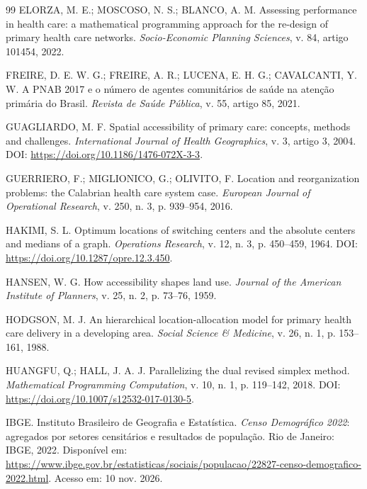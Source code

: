 \documentclass[12pt,a4paper,oneside]{report}
\begin{document}
\begin{thebibliography}{99}
ELORZA, M. E.; MOSCOSO, N. S.; BLANCO, A. M. Assessing performance in health care: a mathematical programming approach for the re-design of primary health care networks. \textit{Socio-Economic Planning Sciences}, v. 84, artigo 101454, 2022.

FREIRE, D. E. W. G.; FREIRE, A. R.; LUCENA, E. H. G.; CAVALCANTI, Y. W. A PNAB 2017 e o número de agentes comunitários de saúde na atenção primária do Brasil. \textit{Revista de Saúde Pública}, v. 55, artigo 85, 2021.

GUAGLIARDO, M. F. Spatial accessibility of primary care: concepts, methods and challenges. \textit{International Journal of Health Geographics}, v. 3, artigo 3, 2004. DOI: \url{https://doi.org/10.1186/1476-072X-3-3}.

GUERRIERO, F.; MIGLIONICO, G.; OLIVITO, F. Location and reorganization problems: the Calabrian health care system case. \textit{European Journal of Operational Research}, v. 250, n. 3, p. 939--954, 2016.

HAKIMI, S. L. Optimum locations of switching centers and the absolute centers and medians of a graph. \textit{Operations Research}, v. 12, n. 3, p. 450--459, 1964. DOI: \url{https://doi.org/10.1287/opre.12.3.450}.

HANSEN, W. G. How accessibility shapes land use. \textit{Journal of the American Institute of Planners}, v. 25, n. 2, p. 73--76, 1959.

HODGSON, M. J. An hierarchical location-allocation model for primary health care delivery in a developing area. \textit{Social Science \& Medicine}, v. 26, n. 1, p. 153--161, 1988.

HUANGFU, Q.; HALL, J. A. J. Parallelizing the dual revised simplex method. \textit{Mathematical Programming Computation}, v. 10, n. 1, p. 119--142, 2018. DOI: \url{https://doi.org/10.1007/s12532-017-0130-5}.

IBGE. Instituto Brasileiro de Geografia e Estatística. \textit{Censo Demográfico 2022}: agregados por setores censitários e resultados de população. Rio de Janeiro: IBGE, 2022. Disponível em: \url{https://www.ibge.gov.br/estatisticas/sociais/populacao/22827-censo-demografico-2022.html}. Acesso em: 10 nov. 2026.


\end{thebibliography}
\end{document}
